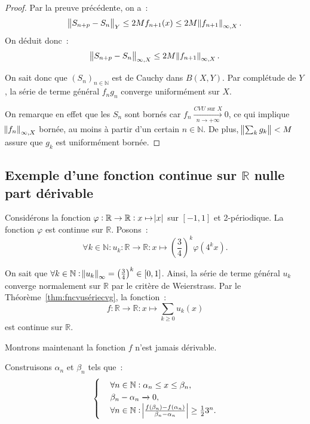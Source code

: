 \documentclass{report}
\theoremstyle{definition}
\theoremstyle{remark}
\numberwithin{equation}{section}
\newcommand{\R}{\mathbb R}
\newcommand{\N}{\mathbb N}
\newcommand{\seq}[3]{\left(#1_{#2}\right)_{#2 \in #3}}
\newcommand{\CONV}[5]{\xrightarrow[#2 \to #3]{#4 \text{ #5 } #1}}
\newcommand{\CVU}[3]{\CONV{#1}{#2}{#3}{CVU}{sur}}
\newcommand{\pinfty}{{+\infty}}
\begin{document}
			\begin{proof} Par la preuve précédente, on a~:
			\begin{equation}
				\norm {S_{n+p} - S_n}_Y \leq 2Mf_{n+1}(x) \leq 2M\norm {f_{n+1}}_{\infty, X}.
			\end{equation}
			On déduit donc~:
			\begin{equation}
				\norm {S_{n+p}-S_n}_{\infty, X} \leq 2M\norm {f_{n+1}}_{\infty, X}.
			\end{equation}

			On sait donc que $\seq Sn\N$ est de Cauchy dans $B(X, Y)$. Par complétude de $Y$, la série de terme général $f_ng_n$ converge uniformément sur $X$.

			On remarque en effet que les $S_n$ sont bornés car $f_n \CVU Xn\pinfty 0$, ce qui implique $\norm {f_n}_{\infty, X}$ bornée, au moins à partir d'un certain
			$n \in \N$. De plus, $\norm {\sum_kg_k} < M$ assure que $g_k$ est uniformément bornée.
			\end{proof}

		\subsection{Exemple d'une fonction continue sur $\R$ nulle part dérivable}
			Considérons la fonction $\varphi : \R \to \R : x \mapsto \abs x$ sur $[-1, 1]$ et 2-périodique. La fonction $\varphi$ est continue sur $\R$. Posons~:
			\begin{equation}
				\forall k \in \N : u_k : \R \to \R : x \mapsto \left(\frac 34\right)^k\varphi(4^kx).
			\end{equation}

			On sait que $\forall k \in \N : \norm {u_k}_\infty = \left(\frac 34\right)^k \in [0, 1]$. Ainsi, la série de terme général $u_k$ converge normalement
			sur $\R$ par le critère de Weierstrass. Par le Théorème~\ref{thm:fncvusériecvg}, la fonction~:
			\begin{equation}
				f : \R \to \R : x \mapsto \sum_{k \geq 0}u_k(x)
			\end{equation}
			est continue sur $\R$.

			Montrons maintenant la fonction $f$ n'est jamais dérivable.

			Construisons $\alpha_n$ et $\beta_n$ tels que~:
			\begin{align}\begin{cases}
				&\forall n \in \N : \alpha_n \leq x \leq \beta_n, \\
				&\beta_n - \alpha_n \xrightarrow[]{} 0, \\
				&\forall n \in \N : \abs {\frac {f(\beta_n) - f(\alpha_n)}{\beta_n - \alpha_n}} \geq \frac 123^n.
			\end{cases}\end{align}
\end{document}
